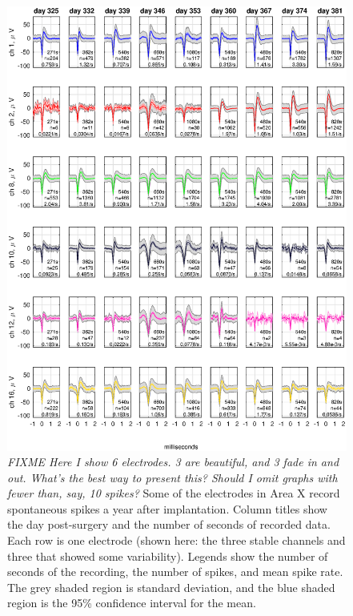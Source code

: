 \documentclass[10pt,letterpaper]{article}
\begin{document}
\begin{figure}
  \includegraphics[width=\textwidth]{XSpikeRecording}
  \caption{{\em FIXME Here I show 6 electrodes.  3 are beautiful, and 3 fade in and out.  What's the best way to present this?  Should I omit graphs with fewer than, say, 10 spikes?}
    Some of the electrodes in Area X record spontaneous spikes
    a year after implantation.  Column titles show the day
    post-surgery and the number of seconds of recorded data.  Each row
    is one electrode (shown here: the three stable channels
    and three that showed some variability).  Legends show the number of seconds of the
    recording, the number of spikes, and mean spike rate.  The grey
    shaded region is standard deviation, and the blue shaded region is
    the 95\% confidence interval for the mean.}
  \label{fig:XSpikeRecording}
\end{figure}
\end{document}
